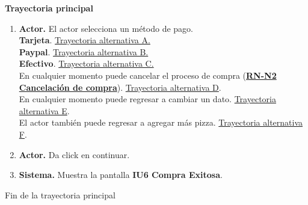 \noindent \textbf{Trayectoria principal}

\begin{enumerate}
	\item {\textbf{Actor.}} El actor selecciona un método de pago.
	\\ \textbf{Tarjeta}. \hyperlink{TAA:CU4}{Trayectoria alternativa A.} 
	\\ \textbf{Paypal}. \hyperlink{TAB:CU4}{Trayectoria alternativa B.}
	\\ \textbf{Efectivo}. \hyperlink{TAC:CU4}{Trayectoria alternativa C.}
	\\ En cualquier momento puede cancelar el proceso de compra (\hyperlink{RN:N2:Cancelacion}{\textbf{RN-N2 Cancelación de compra}}). \hyperlink{TAD:CU3}{Trayectoria alternativa D}.
	\\ En cualquier momento puede regresar a cambiar un dato. \hyperlink{TAE:CU3}{Trayectoria alternativa E}.
	\\ El actor también puede regresar a agregar más pizza. \hyperlink{TAF:CU3}{Trayectoria alternativa F}.

	
	\item {\textbf{Actor.}} \hypertarget{p5}{}Da click en continuar.
	
	\item \textbf{Sistema.} \hypertarget{p6}{}Muestra la pantalla \textbf{IU6 Compra Exitosa}.
		
\end{enumerate}	
Fin de la trayectoria principal
\\

